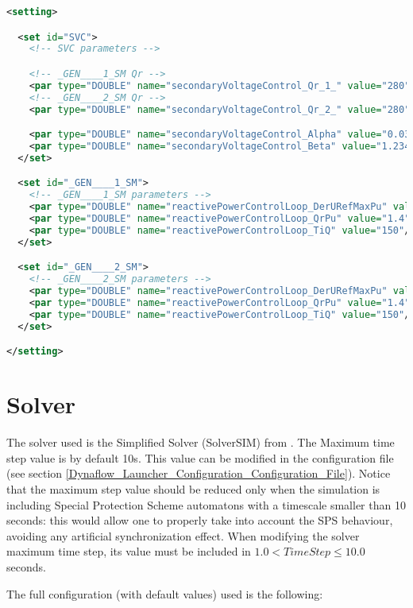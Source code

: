 \documentclass[a4paper, 12pt]{report}
\begin{document}
\begin{lstlisting}[language=XML, breaklines=true, breakatwhitespace=false, columns=fullflexible]
<setting>

  <set id="SVC">
    <!-- SVC parameters -->

    <!-- _GEN____1_SM Qr -->
    <par type="DOUBLE" name="secondaryVoltageControl_Qr_1_" value="280"/>
    <!-- _GEN____2_SM Qr -->
    <par type="DOUBLE" name="secondaryVoltageControl_Qr_2_" value="280"/>

    <par type="DOUBLE" name="secondaryVoltageControl_Alpha" value="0.0308641975"/>
    <par type="DOUBLE" name="secondaryVoltageControl_Beta" value="1.2345679"/>
  </set>

  <set id="_GEN____1_SM">
    <!-- _GEN____1_SM parameters -->
    <par type="DOUBLE" name="reactivePowerControlLoop_DerURefMaxPu" value="0.0002"/>
    <par type="DOUBLE" name="reactivePowerControlLoop_QrPu" value="1.4"/>
    <par type="DOUBLE" name="reactivePowerControlLoop_TiQ" value="150"/>
  </set>

  <set id="_GEN____2_SM">
    <!-- _GEN____2_SM parameters -->
    <par type="DOUBLE" name="reactivePowerControlLoop_DerURefMaxPu" value="0.0002"/>
    <par type="DOUBLE" name="reactivePowerControlLoop_QrPu" value="1.4"/>
    <par type="DOUBLE" name="reactivePowerControlLoop_TiQ" value="150"/>
  </set>

</setting>
\end{lstlisting}


\section{Solver}

The solver used is the Simplified Solver (SolverSIM) from \Dynawo.
The Maximum time step value is by default 10s. This value can be modified in the configuration file (see section \ref{Dynaflow_Launcher_Configuration_Configuration_File}).
Notice that the maximum step value should be reduced only when the simulation is including
Special Protection Scheme automatons with a timescale smaller than 10 seconds: this would allow one to properly
take into account the SPS behaviour, avoiding any artificial synchronization effect. When modifying the
solver maximum time step, its value must be included in $ 1.0  < TimeStep \leq 10.0 $ seconds.

The full configuration (with default values) used is the following:


\end{document}
